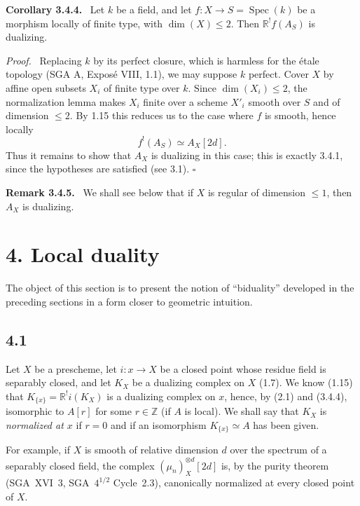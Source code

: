 \documentclass[11pt]{article}
\providecommand{\qedtext}{\hfill$\square$}
\newenvironment{statement}[1]{\par\medskip\noindent\textbf{#1.}\ }{\par\medskip}
\newenvironment{prooftext}[1][Proof]{\par\noindent\emph{#1.}\ }{\par\medskip}
\DeclareMathOperator{\Spec}{Spec}
\newcommand{\Z}{\mathbb{Z}}
\providecommand{\Z}{\mathbb Z}
\providecommand{\Spec}{\operatorname{Spec}}
\providecommand{\Spec}{\operatorname{Spec}}
\providecommand{\Spec}{\operatorname{Spec}}
\providecommand{\qedtext}{\hfill$\square$}
\providecommand{\Spec}{\operatorname{Spec}}
\begin{document}
\begin{statement}{Corollary 3.4.4}
Let $k$ be a field, and let $f:X\to S=\Spec(k)$ be a morphism locally of finite type, with $\dim(X)\le2$. Then $\mathbb{R}^!f(A_S)$ is dualizing.
\end{statement}

\begin{prooftext}
Replacing $k$ by its perfect closure, which is harmless for the étale topology (SGA A, Exposé VIII, 1.1), we may suppose $k$ perfect. Cover $X$ by affine open subsets $X_i$ of finite type over $k$. Since $\dim(X_i)\le2$, the normalization lemma makes $X_i$ finite over a scheme $X'_i$ smooth over $S$ and of dimension $\le2$. By 1.15 this reduces us to the case where $f$ is smooth, hence locally
\[
   f^!(A_S)\simeq A_X[2d].
\]
Thus it remains to show that $A_X$ is dualizing in this case; this is exactly 3.4.1, since the hypotheses are satisfied (see 3.1). \qedtext
\end{prooftext}

\begin{statement}{Remark 3.4.5}
We shall see below that if $X$ is regular of dimension $\le1$, then $A_X$ is dualizing.
\end{statement}

\section*{4. Local duality}

The object of this section is to present the notion of ``biduality'' developed in the preceding sections in a form closer to geometric intuition.

\subsection*{4.1}
Let $X$ be a prescheme, let $i:x\to X$ be a closed point whose residue field is separably closed, and let $K_X$ be a dualizing complex on $X$ (1.7). We know (1.15) that $K_{\{x\}}=\mathbb{R}^{!}i(K_X)$ is a dualizing complex on $x$, hence, by (2.1) and (3.4.4), isomorphic to $A[r]$ for some $r\in\Z$ (if $A$ is local). We shall say that $K_X$ is \emph{normalized at $x$} if $r=0$ and if an isomorphism $K_{\{x\}}\simeq A$ has been given.

For example, if $X$ is smooth of relative dimension $d$ over the spectrum of a separably closed field, the complex $(\mu_n)_X^{\otimes d}[2d]$ is, by the purity theorem (SGA~XVI~3, SGA~$4^{1/2}$ Cycle~2.3), canonically normalized at every closed point of $X$.
\end{document}
